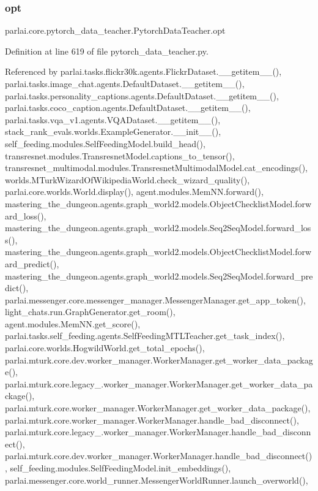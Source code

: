 \subsubsection{\texorpdfstring{opt}{opt}}
{\footnotesize\ttfamily parlai.\+core.\+pytorch\+\_\+data\+\_\+teacher.\+Pytorch\+Data\+Teacher.\+opt}



Definition at line 619 of file pytorch\+\_\+data\+\_\+teacher.\+py.



Referenced by parlai.\+tasks.\+flickr30k.\+agents.\+Flickr\+Dataset.\+\_\+\+\_\+getitem\+\_\+\+\_\+(), parlai.\+tasks.\+image\+\_\+chat.\+agents.\+Default\+Dataset.\+\_\+\+\_\+getitem\+\_\+\+\_\+(), parlai.\+tasks.\+personality\+\_\+captions.\+agents.\+Default\+Dataset.\+\_\+\+\_\+getitem\+\_\+\+\_\+(), parlai.\+tasks.\+coco\+\_\+caption.\+agents.\+Default\+Dataset.\+\_\+\+\_\+getitem\+\_\+\+\_\+(), parlai.\+tasks.\+vqa\+\_\+v1.\+agents.\+V\+Q\+A\+Dataset.\+\_\+\+\_\+getitem\+\_\+\+\_\+(), stack\+\_\+rank\+\_\+evals.\+worlds.\+Example\+Generator.\+\_\+\+\_\+init\+\_\+\+\_\+(), self\+\_\+feeding.\+modules.\+Self\+Feeding\+Model.\+build\+\_\+head(), transresnet.\+modules.\+Transresnet\+Model.\+captions\+\_\+to\+\_\+tensor(), transresnet\+\_\+multimodal.\+modules.\+Transresnet\+Multimodal\+Model.\+cat\+\_\+encodings(), worlds.\+M\+Turk\+Wizard\+Of\+Wikipedia\+World.\+check\+\_\+wizard\+\_\+quality(), parlai.\+core.\+worlds.\+World.\+display(), agent.\+modules.\+Mem\+N\+N.\+forward(), mastering\+\_\+the\+\_\+dungeon.\+agents.\+graph\+\_\+world2.\+models.\+Object\+Checklist\+Model.\+forward\+\_\+loss(), mastering\+\_\+the\+\_\+dungeon.\+agents.\+graph\+\_\+world2.\+models.\+Seq2\+Seq\+Model.\+forward\+\_\+loss(), mastering\+\_\+the\+\_\+dungeon.\+agents.\+graph\+\_\+world2.\+models.\+Object\+Checklist\+Model.\+forward\+\_\+predict(), mastering\+\_\+the\+\_\+dungeon.\+agents.\+graph\+\_\+world2.\+models.\+Seq2\+Seq\+Model.\+forward\+\_\+predict(), parlai.\+messenger.\+core.\+messenger\+\_\+manager.\+Messenger\+Manager.\+get\+\_\+app\+\_\+token(), light\+\_\+chats.\+run.\+Graph\+Generator.\+get\+\_\+room(), agent.\+modules.\+Mem\+N\+N.\+get\+\_\+score(), parlai.\+tasks.\+self\+\_\+feeding.\+agents.\+Self\+Feeding\+M\+T\+L\+Teacher.\+get\+\_\+task\+\_\+index(), parlai.\+core.\+worlds.\+Hogwild\+World.\+get\+\_\+total\+\_\+epochs(), parlai.\+mturk.\+core.\+dev.\+worker\+\_\+manager.\+Worker\+Manager.\+get\+\_\+worker\+\_\+data\+\_\+package(), parlai.\+mturk.\+core.\+legacy\+\_.\+worker\+\_\+manager.\+Worker\+Manager.\+get\+\_\+worker\+\_\+data\+\_\+package(), parlai.\+mturk.\+core.\+worker\+\_\+manager.\+Worker\+Manager.\+get\+\_\+worker\+\_\+data\+\_\+package(), parlai.\+mturk.\+core.\+worker\+\_\+manager.\+Worker\+Manager.\+handle\+\_\+bad\+\_\+disconnect(), parlai.\+mturk.\+core.\+legacy\+\_.\+worker\+\_\+manager.\+Worker\+Manager.\+handle\+\_\+bad\+\_\+disconnect(), parlai.\+mturk.\+core.\+dev.\+worker\+\_\+manager.\+Worker\+Manager.\+handle\+\_\+bad\+\_\+disconnect(), self\+\_\+feeding.\+modules.\+Self\+Feeding\+Model.\+init\+\_\+embeddings(), parlai.\+messenger.\+core.\+world\+\_\+runner.\+Messenger\+World\+Runner.\+launch\+\_\+overworld(), 